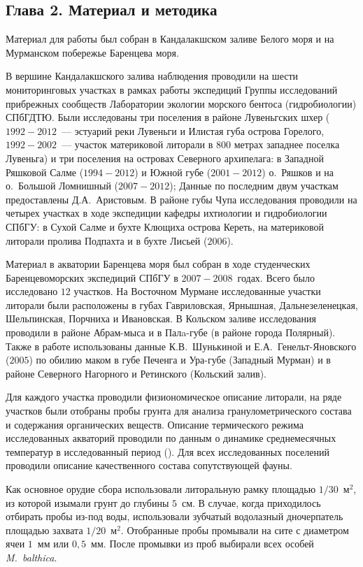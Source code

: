 \subsection*{Глава 2. Материал и методика}

Материал для работы был собран в Кандалакшском заливе Белого моря и на Мурманском побережье Баренцева моря.

В вершине Кандалакшского залива наблюдения проводили на шести мониторинговых участках в рамках работы экспедиций Группы исследований прибрежных сообществ Лаборатории экологии морского бентоса (гидробиологии) СПбГДТЮ. Были исследованы три поселения в районе Лувеньгских шхер ($1992 - 2012$~--- эстуарий реки Лувеньги и Илистая губа острова Горелого, $1992 - 2002$~--- участок материковой литорали в $800$ метрах западнее поселка Лувеньга) 
и три поселения на островах Северного архипелага: в Западной Ряшковой Салме ($1994 - 2012$) и Южной губе ($2001 - 2012$) о.~Ряшков и на о.~Большой Ломнишный ($2007 - 2012$); Данные по последним двум участкам предоставлены Д.\:А.~Аристовым.
В районе губы Чупа исследования проводили на четырех участках в ходе экспедиции кафедры ихтиологии и гидробиологии СПбГУ: в Сухой Салме и бухте Клющиха острова Кереть, на материковой литорали пролива Подпахта и в бухте Лисьей ($2006$).

Материал  в акватории Баренцева моря  был  собран    в ходе   студенческих Баренцевоморских экспедиций СПбГУ в $2007 - 2008$~годах. 
Всего было исследовано $12$ участков.
На Восточном   Мурмане исследованные участки литорали  были   расположены   в   губах   Гавриловская,  Ярнышная, Дальнезеленецкая, Шельпинская, Порчниха и Ивановская.
В   Кольском   заливе исследования проводили в районе Абрам-мыса и в Палa-губе (в районе города Полярный). 
Также в работе использованы данные К.\:В.~Шунькиной и Е.\:А.~Генельт-Яновского ($2005$) по обилию маком в губе Печенга и Ура-губе (Западный Мурман) и в районе Северного Нагорного и Ретинского (Кольский залив).

Для каждого участка проводили физиономическое описание литорали, на ряде участков были отобраны пробы грунта для анализа гранулометрического состава и содержания органических веществ.
Описание термического режима исследованных акваторий проводили по данным о динамике среднемесячных температур в исследованный период (\cite{KGZ_letopis, rp5_Kandalaksha, pinro}).
Для всех исследованных поселений проводили описание качественного состава сопутствующей фауны.

Как основное орудие сбора использовали литоральную рамку площадью $1/30$~м$^2$, из которой изымали грунт до глубины $5$~см. 
В случае, когда приходилось отбирать пробы из-под воды, использовали зубчатый водолазный дночерпатель площадью захвата $1/20$~м$^2$.
Отобранные пробы промывали на сите с диаметром ячеи $1$~мм или $0,5$~мм. 
После промывки из   проб   выбирали   всех   особей  {\it M.~balthica}.

